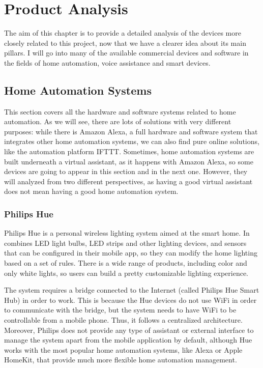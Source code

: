 \chapter{Product Analysis}

The aim of this chapter is to provide a detailed analysis of the devices more closely related to this project, now that we have a 
clearer idea about its main pillars. I will go into many of the available commercial devices and software in the fields of home 
automation, voice assistance and smart devices.

\section{Home Automation Systems}
This section covers all the hardware and software systems related to home automation. As we will see, there are lots of solutions
with very different purposes: while there is Amazon Alexa, a full hardware and software system that integrates other home automation
systems, we can also find pure online solutions, like the automation platform IFTTT. Sometimes, home automation systems are
built underneath a virtual assistant, as it happens with Amazon Alexa, so some devices are going to appear in this section and in the
next one. However, they will analyzed from two different perspectives, as having a good virtual assistant does not mean having a
good home automation system.

\subsection{Philips Hue}
Philips Hue is a personal wireless lighting system aimed at the smart home. In combines LED light bulbs, LED strips and other 
lighting devices, and sensors that can be configured in their mobile app, so they can modify the home lighting based on a set of
rules. There is a wide range of products, including color and only white lights, so users can build a pretty customizable lighting
experience.\cite{philipsHueMeethue}

The system requires a bridge connected to the Internet (called Philips Hue Smart Hub) in order to work. This is because the Hue
devices do not use WiFi in order to communicate with the bridge, but the system needs to have WiFi to be controllable from a 
mobile phone. Thus, it follows a centralized architecture. Moreover, Philips does not provide any type of assistant or external interface
to manage the system apart from the mobile application by default, although Hue works with the most popular home automation
systems, like Alexa or Apple HomeKit, that provide much more flexible home automation management.

